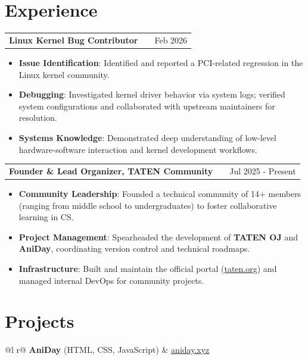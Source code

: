 \documentclass[a4paper,12pt]{article}
\makeatletter
\newenvironment{joblong}[2]
    {
    \begin{tabularx}{\linewidth}{@{}l X r@{}}
    \textbf{#1} & \hfill &  #2 \\[3.75pt]
    \end{tabularx}
    \begin{minipage}[t]{\linewidth}
    \begin{itemize}[nosep,after=\strut, leftmargin=1em, itemsep=3pt,label=--]
    }
    {
    \end{itemize}
    \end{minipage}    
    }
\makeatother
\begin{document}
\section{Experience}

\begin{joblong}{Linux Kernel Bug Contributor}{Feb 2026}
\item \textbf{Issue Identification}: Identified and reported a PCI-related regression in the Linux kernel community.
\item \textbf{Debugging}: Investigated kernel driver behavior via system logs; verified system configurations and collaborated with upstream maintainers for resolution.
\item \textbf{Systems Knowledge}: Demonstrated deep understanding of low-level hardware-software interaction and kernel development workflows.
\end{joblong}

\begin{joblong}{Founder \& Lead Organizer, TATEN Community}{Jul 2025 - Present}
\item \textbf{Community Leadership}: Founded a technical community of 14+ members (ranging from middle school to undergraduates) to foster collaborative learning in CS.
\item \textbf{Project Management}: Spearheaded the development of \textbf{TATEN OJ} and \textbf{AniDay}, coordinating version control and technical roadmaps.
\item \textbf{Infrastructure}: Built and maintain the official portal (\href{https://taten.org}{taten.org}) and managed internal DevOps for community projects.
\end{joblong}
  
\section{Projects}

\begin{tabularx}{\linewidth}{ @{}l r@{} }
\textbf{AniDay} \small{(HTML, CSS, JavaScript)} & \hfill \href{https://aniday.xyz}{aniday.xyz} \\[3.75pt]
  \\
\end{tabularx}
\end{document}
